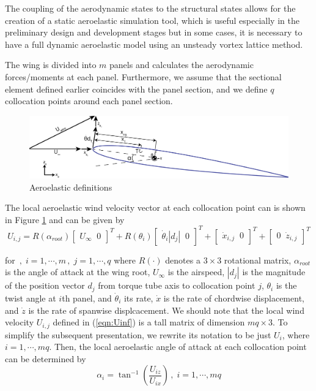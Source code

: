 \documentclass[11pt]{ucthesis}
\begin{document}
The coupling of the aerodynamic states to the structural states allows for the creation of a static aeroelastic simulation tool, which is useful especially in the preliminary design and development stages but in some cases, it is necessary to have a full dynamic aeroelastic model using an unsteady vortex lattice method. 

The wing is divided into $m$ panels and calculates the aerodynamic forces/moments at each panel. Furthermore, we assume that the sectional element defined earlier coincides with the panel section, and we define $q$ collocation points around each panel section. 

\begin{figure}[thpb]
\centering
\includegraphics[width=1\linewidth]{Figures/FullAeroelasticDefinitions.png}
\caption{Aeroelastic definitions}
\label{fig:def}
\end{figure}

The local aeroelastic wind velocity vector at each collocation point can is shown in Figure \ref{fig:def} and can be given by
\begin{equation}
U_{i,j} = R(\alpha_{root})\begin{bmatrix}U_{\infty} \;\; 0\end{bmatrix}^T +  R(\theta_{i})\begin{bmatrix}\dot{\theta}_{i} |d_{j}| \;\; 0\end{bmatrix}^T + \begin{bmatrix}\dot{x}_{i,j}\;\; 0\end{bmatrix}^T + \begin{bmatrix}0\;\; \dot{z}_{i,j}\end{bmatrix}^T
\label{eqn:Uinf}
\end{equation}

for $ \,,\;i=1,\cdots, m\,,\;j=1,\cdots, q$ where $R(\cdot)$ denotes a $3\times 3$ rotational matrix, $\alpha_{root}$ is the angle of attack at the wing root, $U_{\infty}$ is the airspeed, $|d_{j}|$ is the magnitude of the position vector $d_{j}$ from torque tube axis to collocation point $j$, $\theta_i$ is the twist angle at $i$th panel, and $\dot{\theta}_i$ its rate, $\dot{x}$ is the rate of chordwise displacement, and $\dot{z}$ is the rate of spanwise displcacement. We should note that the local wind velocity $U_{i,j}$ defined in (\ref{eqn:Uinf}) is a tall matrix of dimension $mq \times 3$. To simplify the subsequent presentation, we rewrite its notation to be just $U_i$, where $i=1,\cdots,mq$. Then, the local aeroelastic angle of attack at each collocation point can be determined by
\begin{equation}
\alpha_{i} = \tan^{-1} \left (\frac{U_{iz}}{U_{ix}} \right) \,,\;i=1,\cdots, mq
\label{eqn:alpha_aero}
\end{equation}
\end{document}
